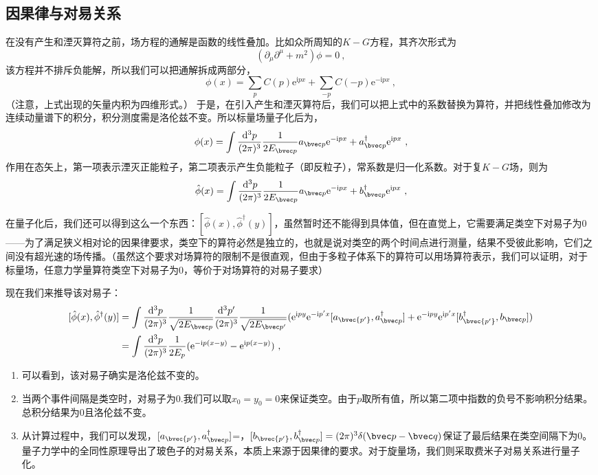 \subsection{因果律与对易关系}
在没有产生和湮灭算符之前，场方程的通解是函数的线性叠加。比如众所周知的$K-G$方程，其齐次形式为
$$(\partial_\mu\partial^\mu+m^2)\phi=0~,$$
该方程并不排斥负能解，所以我们可以把通解拆成两部分，
$$\phi(x)=\sum_pC(p)\mathrm e ^{\mathrm {i} px}+\sum_{-p}C(-p)\mathrm e ^{-\mathrm {i} px}~,$$
（注意，上式出现的矢量内积为四维形式。）
于是，在引入产生和湮灭算符后，我们可以把上式中的系数替换为算符，并把线性叠加修改为连续动量谱下的积分，积分测度需是洛伦兹不变。所以标量场量子化后为，
\begin{equation}
\phi (x)=\int\frac{\mathrm d^3 p}{(2\pi )^3}\frac {1}{2E_{\bvec p}} a_{\bvec p}\mathrm e^{-\mathrm ipx}+a_{\bvec p}^\dagger\mathrm e^{\mathrm ipx}~,
\end{equation}
作用在态矢上，第一项表示湮灭正能粒子，第二项表示产生负能粒子（即反粒子），常系数是归一化系数。对于复$K-G$场，则为
\begin{equation}
\hat \phi (x)=\int\frac{\mathrm d^3 p}{(2\pi )^3}\frac {1}{2E_{\bvec p}} a_{\bvec p}\mathrm e^{-\mathrm ipx}+b_{\bvec p}^\dagger\mathrm e^{\mathrm ipx}~,
\end{equation}

在量子化后，我们还可以得到这么一个东西：$[\hat{\phi}(x),\hat{\phi}^\dagger(y)]$，虽然暂时还不能得到具体值，但在直觉上，它需要满足类空下对易子为0——为了满足狭义相对论的因果律要求，类空下的算符必然是独立的，也就是说对类空的两个时间点进行测量，结果不受彼此影响，它们之间没有超光速的场传播。（虽然这个要求对场算符的限制不是很直观，但由于多粒子体系下的算符可以用场算符表示，我们可以证明，对于标量场，任意力学量算符类空下对易子为0，等价于对场算符的对易子要求）

现在我们来推导该对易子：
\begin{equation}
\begin{aligned}
[\hat{\phi}(x),\hat{\phi}^\dagger(y)]&=\int\frac{\mathrm d^3p}{(2\pi )^3}\frac {1}{\sqrt{2 E_{\bvec p}}}\frac{\mathrm d^3p'}{(2\pi )^3}\frac {1}{\sqrt{2 E_{\bvec p'}}}(\mathrm {e}^{\mathrm {i}py}\mathrm {e}^{-\mathrm {i}p'x}[a_{\bvec {p'}},a^\dagger_{\bvec p}]+ \mathrm e^{-\mathrm i py}\mathrm e^{\mathrm i p'x}[b^\dagger_{\bvec {p'}},b_{{\bvec p}}])\\
&=\int \frac {\mathrm d^3 p}{(2 \pi)^3}\frac {1}{2 E_p}(\mathrm e^{-\mathrm i p(x-y)}-\mathrm e^{\mathrm i p(x-y)})~,
\end{aligned}
\end{equation}
\begin{enumerate}
\item 可以看到，该对易子确实是洛伦兹不变的。
\item 当两个事件间隔是类空时，对易子为0.我们可以取$x_0=y_0=0$来保证类空。由于$p$取所有值，所以第二项中指数的负号不影响积分结果。总积分结果为0且洛伦兹不变。
\item 从计算过程中，我们可以发现，$[a_{\bvec {p'}},a^\dagger_{\bvec p}]$=，$[b_{\bvec {p'}},b^\dagger_{\bvec p}]=(2\pi)^3\delta(\bvec p-\bvec q)$保证了最后结果在类空间隔下为$0$。量子力学中的全同性原理导出了玻色子的对易关系，本质上来源于因果律的要求。对于旋量场，我们则采取费米子对易关系进行量子化。
\end{enumerate}
